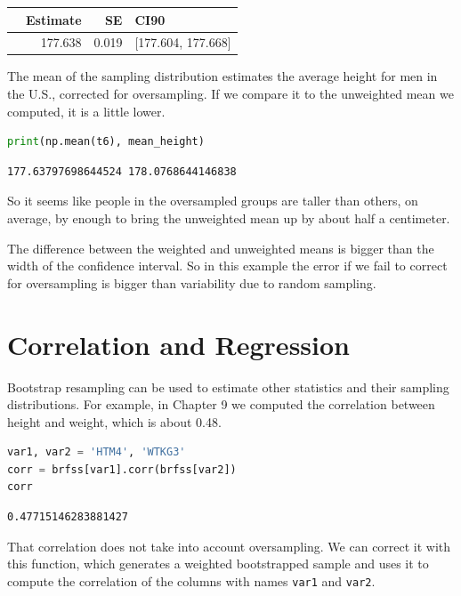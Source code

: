 \begin{tabular}{lrrl}
\toprule
{} &  Estimate &     SE &                CI90 \\
\midrule
{} &   177.638 &  0.019 &  [177.604, 177.668] \\
\bottomrule
\end{tabular}

The mean of the sampling distribution estimates the average height for
men in the U.S., corrected for oversampling. If we compare it to the
unweighted mean we computed, it is a little lower.

\begin{lstlisting}[language=Python]
print(np.mean(t6), mean_height)
\end{lstlisting}

\begin{lstlisting}[]
177.63797698644524 178.0768644146838
\end{lstlisting}

So it seems like people in the oversampled groups are taller than
others, on average, by enough to bring the unweighted mean up by about
half a centimeter.

The difference between the weighted and unweighted means is bigger than
the width of the confidence interval. So in this example the error if we
fail to correct for oversampling is bigger than variability due to
random sampling.

\hypertarget{correlation-and-regression}{%
\section{Correlation and Regression}\label{correlation-and-regression}}

Bootstrap resampling can be used to estimate other statistics and their
sampling distributions. For example, in Chapter 9 we computed the
correlation between height and weight, which is about 0.48.

\begin{lstlisting}[language=Python]
var1, var2 = 'HTM4', 'WTKG3'
corr = brfss[var1].corr(brfss[var2])
corr
\end{lstlisting}

\begin{lstlisting}[]
0.47715146283881427
\end{lstlisting}

That correlation does not take into account oversampling. We can correct
it with this function, which generates a weighted bootstrapped sample
and uses it to compute the correlation of the columns with names
\passthrough{\lstinline!var1!} and \passthrough{\lstinline!var2!}.

